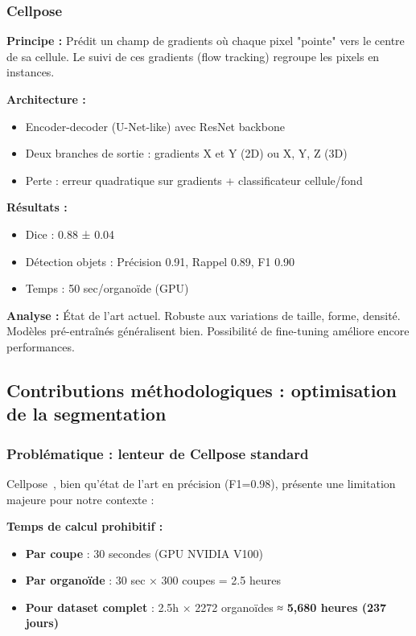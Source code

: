 \subsubsection{Cellpose}

\textbf{Principe :}
Prédit un champ de gradients où chaque pixel "pointe" vers le centre de sa cellule. Le suivi de ces gradients (flow tracking) regroupe les pixels en instances.

\textbf{Architecture :}
\begin{itemize}
    \item Encoder-decoder (U-Net-like) avec ResNet backbone
    \item Deux branches de sortie : gradients X et Y (2D) ou X, Y, Z (3D)
    \item Perte : erreur quadratique sur gradients + classificateur cellule/fond
\end{itemize}

\textbf{Résultats :}
\begin{itemize}
    \item Dice : 0.88 ± 0.04
    \item Détection objets : Précision 0.91, Rappel 0.89, F1 0.90
    \item Temps : 50 sec/organoïde (GPU)
\end{itemize}

\textbf{Analyse :}
État de l'art actuel. Robuste aux variations de taille, forme, densité. Modèles pré-entraînés généralisent bien. Possibilité de fine-tuning améliore encore performances.

\subsection{Contributions méthodologiques : optimisation de la segmentation}

\subsubsection{Problématique : lenteur de Cellpose standard}

Cellpose~\cite{Stringer2021}, bien qu'état de l'art en précision (F1=0.98), présente une limitation majeure pour notre contexte :

\textbf{Temps de calcul prohibitif :}
\begin{itemize}
    \item \textbf{Par coupe} : 30 secondes (GPU NVIDIA V100)
    \item \textbf{Par organoïde} : 30 sec × 300 coupes = 2.5 heures
    \item \textbf{Pour dataset complet} : 2.5h × 2272 organoïdes ≈ \textbf{5,680 heures (237 jours)}
\end{itemize}

